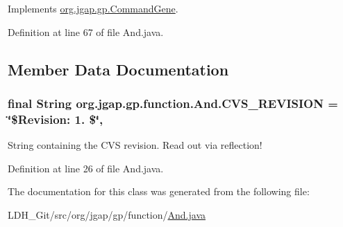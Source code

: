 Implements \hyperlink{classorg_1_1jgap_1_1gp_1_1_command_gene_a236141d99059da808afe7a9217e411c7}{org.\-jgap.\-gp.\-Command\-Gene}.



Definition at line 67 of file And.\-java.



\subsection{Member Data Documentation}
\hypertarget{classorg_1_1jgap_1_1gp_1_1function_1_1_and_a8767e982e4da35105d1152c0e35e10e5}{
\subsubsection[{C\-V\-S\-\_\-\-R\-E\-V\-I\-S\-I\-O\-N}]{\setlength{\rightskip}{0pt plus 5cm}final String org.\-jgap.\-gp.\-function.\-And.\-C\-V\-S\-\_\-\-R\-E\-V\-I\-S\-I\-O\-N = \char`\"{}\$Revision\-: 1. \$\char`\"{}\hspace{0.3cm}{\ttfamily [static]}, {\ttfamily [private]}}}\label{classorg_1_1jgap_1_1gp_1_1function_1_1_and_a8767e982e4da35105d1152c0e35e10e5}
String containing the C\-V\-S revision. Read out via reflection! 

Definition at line 26 of file And.\-java.



The documentation for this class was generated from the following file\-:\begin{DoxyCompactItemize}
\item 
L\-D\-H\-\_\-\-Git/src/org/jgap/gp/function/\hyperlink{_and_8java}{And.\-java}\end{DoxyCompactItemize}
